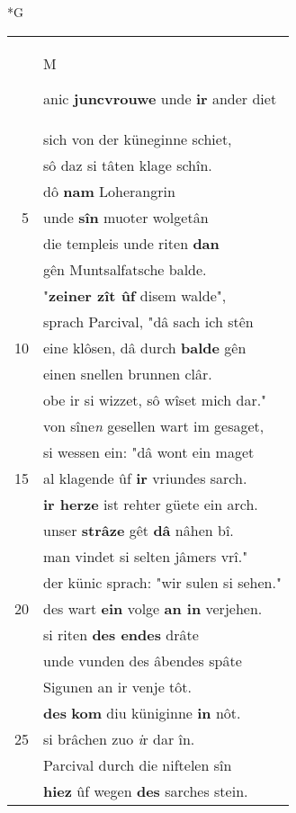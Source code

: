 \documentclass[8pt,a4paper,notitlepage]{article}
\begin{document}
\begin{table}[ht]
\begin{minipage}[t]{0.5\linewidth}
\small
\begin{center}*G
\end{center}
\begin{tabular}{rl}
 & \begin{large}M\end{large}anic \textbf{juncvrouwe} unde \textbf{ir} ander diet\\ 
 & sich von der küneginne schiet,\\ 
 & sô daz si tâten klage schîn.\\ 
 & dô \textbf{nam} Loherangrin\\ 
5 & unde \textbf{sîn} muoter wolgetân\\ 
 & die templeis unde riten \textbf{dan}\\ 
 & gên Muntsalfatsche balde.\\ 
 & "\textbf{zeiner zît ûf} disem walde",\\ 
 & sprach Parcival, "dâ sach ich stên\\ 
10 & eine klôsen, dâ durch \textbf{balde} gên\\ 
 & einen snellen brunnen clâr.\\ 
 & obe ir si wizzet, sô wîset mich dar."\\ 
 & von sîne\textit{n} gesellen wart im gesaget,\\ 
 & si wessen ein: "dâ wont ein maget\\ 
15 & al klagende ûf \textbf{ir} vriundes sarch.\\ 
 & \textbf{ir herze} ist rehter güete ein arch.\\ 
 & unser \textbf{strâze} gêt \textbf{dâ} nâhen bî.\\ 
 & man vindet si selten jâmers vrî."\\ 
 & der künic sprach: "wir sulen si sehen."\\ 
20 & des wart \textbf{ein} volge \textbf{an in} verjehen.\\ 
 & si riten \textbf{des endes} drâte\\ 
 & unde vunden des âbendes spâte\\ 
 & Sigunen an ir venje tôt.\\ 
 & \textbf{des} \textbf{kom} diu küniginne \textbf{in} nôt.\\ 
25 & si brâchen zuo \textit{i}r dar în.\\ 
 & Parcival durch die niftelen sîn\\ 
 & \textbf{hiez} ûf wegen \textbf{des} sarches stein.\\ 

\end{tabular}
\end{minipage}
\end{table}
\end{document}
